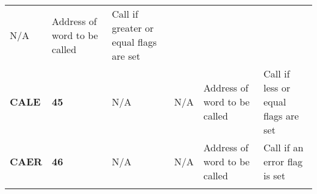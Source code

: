 \documentclass[]{article}
\begin{document}
\begin{longtable}[c]{@{}llllll@{}}
\begin{minipage}[t]{0.14\columnwidth}
N/A
\strut\end{minipage} &
\begin{minipage}[t]{0.14\columnwidth}\raggedright\strut
Address of word to be called
\strut\end{minipage} &
\begin{minipage}[t]{0.14\columnwidth}\raggedright\strut
Call if greater or equal flags are set
\strut\end{minipage}\tabularnewline
\begin{minipage}[t]{0.14\columnwidth}\raggedright\strut
\textbf{CALE}
\strut\end{minipage} &
\begin{minipage}[t]{0.14\columnwidth}\raggedright\strut
\textbf{45}
\strut\end{minipage} &
\begin{minipage}[t]{0.14\columnwidth}\raggedright\strut
N/A
\strut\end{minipage} &
\begin{minipage}[t]{0.14\columnwidth}\raggedright\strut
N/A
\strut\end{minipage} &
\begin{minipage}[t]{0.14\columnwidth}\raggedright\strut
Address of word to be called
\strut\end{minipage} &
\begin{minipage}[t]{0.14\columnwidth}\raggedright\strut
Call if less or equal flags are set
\strut\end{minipage}\tabularnewline
\begin{minipage}[t]{0.14\columnwidth}\raggedright\strut
\textbf{CAER}
\strut\end{minipage} &
\begin{minipage}[t]{0.14\columnwidth}\raggedright\strut
\textbf{46}
\strut\end{minipage} &
\begin{minipage}[t]{0.14\columnwidth}\raggedright\strut
N/A
\strut\end{minipage} &
\begin{minipage}[t]{0.14\columnwidth}\raggedright\strut
N/A
\strut\end{minipage} &
\begin{minipage}[t]{0.14\columnwidth}\raggedright\strut
Address of word to be called
\strut\end{minipage} &
\begin{minipage}[t]{0.14\columnwidth}\raggedright\strut
Call if an error flag is set
\strut\end{minipage}\tabularnewline
\begin{minipage}[t]{0.14\columnwidth}\raggedright\strut

\end{minipage}
\end{longtable}
\end{document}
